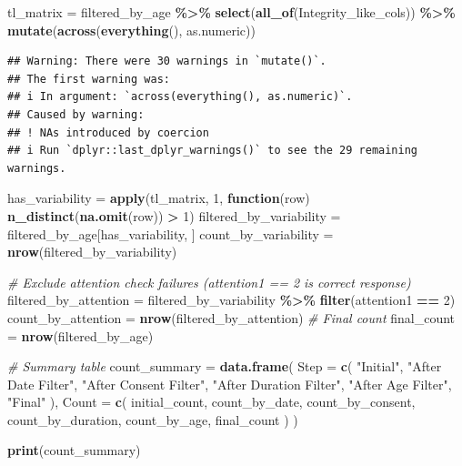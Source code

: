 \documentclass[
]{article}
\newenvironment{Shaded}{\begin{snugshade}}{\end{snugshade}}
\newcommand{\AttributeTok}[1]{\textcolor[rgb]{0.13,0.29,0.53}{#1}}
\newcommand{\CommentTok}[1]{\textcolor[rgb]{0.56,0.35,0.01}{\textit{#1}}}
\newcommand{\ControlFlowTok}[1]{\textcolor[rgb]{0.13,0.29,0.53}{\textbf{#1}}}
\newcommand{\DecValTok}[1]{\textcolor[rgb]{0.00,0.00,0.81}{#1}}
\newcommand{\FunctionTok}[1]{\textcolor[rgb]{0.13,0.29,0.53}{\textbf{#1}}}
\newcommand{\NormalTok}[1]{#1}
\newcommand{\OtherTok}[1]{\textcolor[rgb]{0.56,0.35,0.01}{#1}}
\newcommand{\SpecialCharTok}[1]{\textcolor[rgb]{0.81,0.36,0.00}{\textbf{#1}}}
\newcommand{\StringTok}[1]{\textcolor[rgb]{0.31,0.60,0.02}{#1}}
\begin{document}
\begin{Shaded}
\begin{Highlighting}[]
\NormalTok{tl\_matrix }\OtherTok{=}\NormalTok{ filtered\_by\_age }\SpecialCharTok{\%\textgreater{}\%}
  \FunctionTok{select}\NormalTok{(}\FunctionTok{all\_of}\NormalTok{(Integrity\_like\_cols)) }\SpecialCharTok{\%\textgreater{}\%}
  \FunctionTok{mutate}\NormalTok{(}\FunctionTok{across}\NormalTok{(}\FunctionTok{everything}\NormalTok{(), as.numeric))}
\end{Highlighting}
\end{Shaded}

\begin{verbatim}
## Warning: There were 30 warnings in `mutate()`.
## The first warning was:
## i In argument: `across(everything(), as.numeric)`.
## Caused by warning:
## ! NAs introduced by coercion
## i Run `dplyr::last_dplyr_warnings()` to see the 29 remaining warnings.
\end{verbatim}

\begin{Shaded}
\begin{Highlighting}[]
\NormalTok{has\_variability }\OtherTok{=} \FunctionTok{apply}\NormalTok{(tl\_matrix, }\DecValTok{1}\NormalTok{, }\ControlFlowTok{function}\NormalTok{(row) }\FunctionTok{n\_distinct}\NormalTok{(}\FunctionTok{na.omit}\NormalTok{(row)) }\SpecialCharTok{\textgreater{}} \DecValTok{1}\NormalTok{)}
\NormalTok{filtered\_by\_variability }\OtherTok{=}\NormalTok{ filtered\_by\_age[has\_variability, ]}
\NormalTok{count\_by\_variability }\OtherTok{=} \FunctionTok{nrow}\NormalTok{(filtered\_by\_variability)}

\CommentTok{\# Exclude attention check failures (attention1 == 2 is correct response)}
\NormalTok{filtered\_by\_attention }\OtherTok{=}\NormalTok{ filtered\_by\_variability }\SpecialCharTok{\%\textgreater{}\%}
  \FunctionTok{filter}\NormalTok{(attention1 }\SpecialCharTok{==} \DecValTok{2}\NormalTok{)}
\NormalTok{count\_by\_attention }\OtherTok{=} \FunctionTok{nrow}\NormalTok{(filtered\_by\_attention)}
\CommentTok{\# Final count}
\NormalTok{final\_count }\OtherTok{=} \FunctionTok{nrow}\NormalTok{(filtered\_by\_age)}

\CommentTok{\# Summary table}
\NormalTok{count\_summary }\OtherTok{=} \FunctionTok{data.frame}\NormalTok{(}
  \AttributeTok{Step =} \FunctionTok{c}\NormalTok{(}
    \StringTok{"Initial"}\NormalTok{,}
    \StringTok{"After Date Filter"}\NormalTok{,}
    \StringTok{"After Consent Filter"}\NormalTok{,}
    \StringTok{"After Duration Filter"}\NormalTok{,}
    \StringTok{"After Age Filter"}\NormalTok{,}
    \StringTok{"Final"}
\NormalTok{  ),}
  \AttributeTok{Count =} \FunctionTok{c}\NormalTok{(}
\NormalTok{    initial\_count,}
\NormalTok{    count\_by\_date,}
\NormalTok{    count\_by\_consent,}
\NormalTok{    count\_by\_duration,}
\NormalTok{    count\_by\_age,}
\NormalTok{    final\_count}
\NormalTok{  )}
\NormalTok{)}

\FunctionTok{print}\NormalTok{(count\_summary)}
\end{Highlighting}
\end{Shaded}
\end{document}
